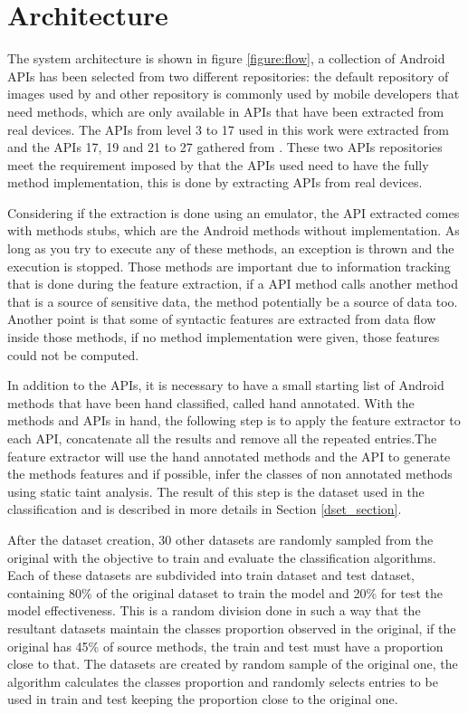 \chapter{Architecture}

The system architecture is shown in figure \ref{figure:flow}, a collection of Android APIs has been selected from two different repositories: the default repository of images used by \cite{rasthofer2014machine} and other repository is commonly used by mobile developers that need methods, which are only available in APIs that have been extracted from real devices. The APIs from level 3 to 17 used in this work were extracted from \cite{rasthofer2014api} and the APIs 17, 19 and 21 to 27 gathered from \cite{hiddenapi}. These two APIs repositories meet the requirement imposed by \cite{rasthofer2014machine} that the APIs used need to have the fully method implementation, this is done by extracting APIs from real devices.

Considering if the extraction is done using an emulator, the API extracted comes with methods stubs, which are the Android methods without implementation. As long as you try to execute any of these methods, an exception is thrown and the execution is stopped. Those methods are important due to information tracking that is done during the feature extraction, if a API method calls another method that is a source of sensitive data, the method potentially be a source of data too. Another point is that some of syntactic features are extracted from data flow inside those methods, if no method implementation were given, those features could not be computed.

In addition to the APIs, it is necessary to have a small starting list of Android methods that have been hand classified, called hand annotated. With the methods and APIs in hand, the following step is to apply the feature extractor to each API, concatenate all the results and remove all the repeated entries.The feature extractor will use the hand annotated methods and the API to generate the methods features and if possible, infer the classes of non annotated methods using static taint analysis. The result of this step is the dataset used in the classification and is described in more details in Section \ref{dset_section}.

After the dataset creation, 30 other datasets are randomly sampled from the original with the objective to train and evaluate the classification algorithms. Each of these datasets are subdivided into train dataset and test dataset, containing 80\% of the original dataset to train the model and 20\% for test the model effectiveness. This is a random division done in such a way that the resultant datasets maintain the classes proportion observed in the original, if the original has 45\% of source methods, the train and test must have a proportion close to that. The datasets are created by random sample of the original one, the algorithm calculates the classes proportion and randomly selects entries to be used in train and test keeping the proportion close to the original one.

